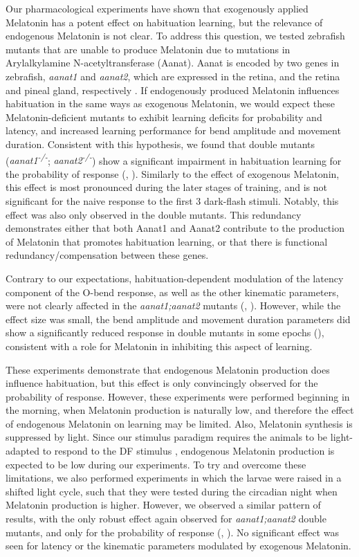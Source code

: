 \documentclass[9.5pt]{RandlettLab_elife}            %
\begin{document}
Our pharmacological experiments have shown that exogenously applied Melatonin has a potent effect on habituation learning, but the relevance of endogenous Melatonin is not clear. 
To address this question, we tested zebrafish mutants that are unable to produce Melatonin due to mutations in Arylalkylamine N-acetyltransferase (Aanat). 
Aanat is encoded by two genes in zebrafish, \emph{aanat1} and \emph{aanat2}, which are expressed in the retina, and the retina and pineal gland, respectively \citep{Gandhi2015_NEURON, Hill2026}. 
If endogenously produced Melatonin influences habituation in the same ways as exogenous Melatonin, we would expect these Melatonin-deficient mutants to exhibit learning deficits for probability and latency, and increased learning performance for bend amplitude and movement duration. 
Consistent with this hypothesis, we found that double mutants (\emph{aanat1\textsuperscript{-/-}}; \emph{aanat2\textsuperscript{-/-}}) show a significant impairment in habituation learning for the probability of response (, ). 
Similarly to the effect of exogenous Melatonin, this effect is most pronounced during the later stages of training, and is not significant for the naive response to the first 3 dark-flash stimuli. 
Notably, this effect was also only observed in the double mutants.
This redundancy demonstrates either that both Aanat1 and Aanat2 contribute to the production of Melatonin that promotes habituation learning, or that there is functional redundancy/compensation between these genes.

Contrary to our expectations, habituation-dependent modulation of the latency component of the O-bend response, as well as the other kinematic parameters, were not clearly affected in the \emph{aanat1;aanat2} mutants (, ). However, while the effect size was small, the bend amplitude and movement duration parameters did show a significantly reduced response in double mutants in some epochs (), consistent with a role for Melatonin in inhibiting this aspect of learning.

These experiments demonstrate that endogenous Melatonin production does influence habituation, but this effect is only convincingly observed for the probability of response. 
However, these experiments were performed beginning in the morning, when Melatonin production is naturally low, and therefore the effect of endogenous Melatonin on learning may be limited.
Also, Melatonin synthesis is suppressed by light. 
Since our stimulus paradigm requires the animals to be light-adapted to respond to the DF stimulus \citep{Burgess2007-2}, endogenous Melatonin production is expected to be low during our experiments. 
To try and overcome these limitations, we also performed experiments in which the larvae were raised in a shifted light cycle, such that they were tested during the circadian night when Melatonin production is higher. 
However, we observed a similar pattern of results, with the only robust effect again observed for \emph{aanat1;aanat2} double mutants, and only for the probability of response (, ). 
No significant effect was seen for latency or the kinematic parameters modulated by exogenous Melatonin. 
\end{document}
